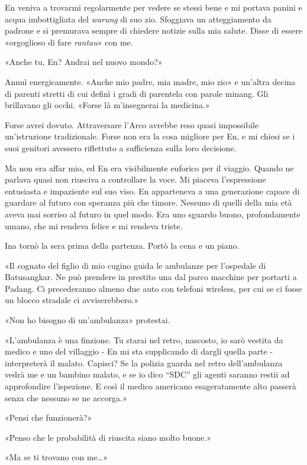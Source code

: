 En veniva a trovarmi regolarmente per vedere se stessi bene e mi portava
panini e acqua imbottigliata del \emph{warung} di suo zio. Sfoggiava un
atteggiamento da padrone e si premurava sempre di chiedere notizie sulla
mia salute. Disse di essere «orgoglioso di fare \emph{rantau}» con me.

«Anche tu, En? Andrai nel nuovo mondo?»

Annuì energicamente. «Anche mio padre, mia madre, mio zio» e un'altra
decina di parenti stretti di cui definì i gradi di parentela con parole
minang. Gli brillavano gli occhi. «Forse là m'insegnerai la medicina.»

Forse avrei dovuto. Attraversare l'Arco avrebbe reso quasi impossibile
un'istruzione tradizionale. Forse non era la cosa migliore per En, e mi
chiesi se i suoi genitori avessero riflettuto a sufficienza sulla loro
decisione.

Ma non era affar mio, ed En era visibilmente euforico per il viaggio.
Quando ne parlava quasi non riusciva a controllare la voce. Mi piaceva
l'espressione entusiasta e impaziente sul suo viso. En apparteneva a una
generazione capace di guardare al futuro con speranza più che timore.
Nessuno di quelli della mia età aveva mai sorriso al futuro in quel
modo. Era uno sguardo buono, profondamente umano, che mi rendeva felice
e mi rendeva triste.

Ina tornò la sera prima della partenza. Portò la cena e un piano.

«Il cognato del figlio di mio cugino guida le ambulanze per l'ospedale
di Batusangkar. Ne può prendere in prestito una dal parco macchine per
portarti a Padang. Ci precederanno almeno due auto con telefoni
wireless, per cui se ci fosse un blocco stradale ci avviserebbero.»

«Non ho bisogno di un'ambulanza» protestai.

«L'ambulanza è una finzione. Tu starai nel retro, nascosto, io sarò
vestita da medico e uno del villaggio - En mi sta supplicando di dargli
quella parte - interpreterà il malato. Capisci? Se la polizia guarda nel
retro dell'ambulanza vedrà me e un bambino malato, e se io dico ``SDC''
gli agenti saranno restii ad approfondire l'ispezione. E così il medico
americano esageratamente alto passerà senza che nessuno se ne accorga.»

«Pensi che funzionerà?»

«Penso che le probabilità di riuscita siano molto buone.»

«Ma se ti trovano con me\ldots»

